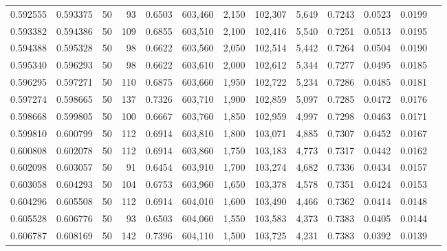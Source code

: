 \begin{tabular}{rrrrrrrrrrrrr}
0.592555 & 0.593375 &    50 &  93 &                                     0.6503 & 603,460 &   2,150 & 102,307 &   5,649 & 0.7243 & 0.0523 & 0.0199 \\
0.593382 & 0.594386 &    50 & 109 &                                     0.6855 & 603,510 &   2,100 & 102,416 &   5,540 & 0.7251 & 0.0513 & 0.0195 \\
0.594388 & 0.595328 &    50 &  98 &                                     0.6622 & 603,560 &   2,050 & 102,514 &   5,442 & 0.7264 & 0.0504 & 0.0190 \\
0.595340 & 0.596293 &    50 &  98 &                                     0.6622 & 603,610 &   2,000 & 102,612 &   5,344 & 0.7277 & 0.0495 & 0.0185 \\
0.596295 & 0.597271 &    50 & 110 &                                     0.6875 & 603,660 &   1,950 & 102,722 &   5,234 & 0.7286 & 0.0485 & 0.0181 \\
0.597274 & 0.598665 &    50 & 137 &                                     0.7326 & 603,710 &   1,900 & 102,859 &   5,097 & 0.7285 & 0.0472 & 0.0176 \\
0.598668 & 0.599805 &    50 & 100 &                                     0.6667 & 603,760 &   1,850 & 102,959 &   4,997 & 0.7298 & 0.0463 & 0.0171 \\
0.599810 & 0.600799 &    50 & 112 &                                     0.6914 & 603,810 &   1,800 & 103,071 &   4,885 & 0.7307 & 0.0452 & 0.0167 \\
0.600808 & 0.602078 &    50 & 112 &                                     0.6914 & 603,860 &   1,750 & 103,183 &   4,773 & 0.7317 & 0.0442 & 0.0162 \\
0.602098 & 0.603057 &    50 &  91 &                                     0.6454 & 603,910 &   1,700 & 103,274 &   4,682 & 0.7336 & 0.0434 & 0.0157 \\
0.603058 & 0.604293 &    50 & 104 &                                     0.6753 & 603,960 &   1,650 & 103,378 &   4,578 & 0.7351 & 0.0424 & 0.0153 \\
0.604296 & 0.605508 &    50 & 112 &                                     0.6914 & 604,010 &   1,600 & 103,490 &   4,466 & 0.7362 & 0.0414 & 0.0148 \\
0.605528 & 0.606776 &    50 &  93 &                                     0.6503 & 604,060 &   1,550 & 103,583 &   4,373 & 0.7383 & 0.0405 & 0.0144 \\
0.606787 & 0.608169 &    50 & 142 &                                     0.7396 & 604,110 &   1,500 & 103,725 &   4,231 & 0.7383 & 0.0392 & 0.0139 \\

\end{tabular}
